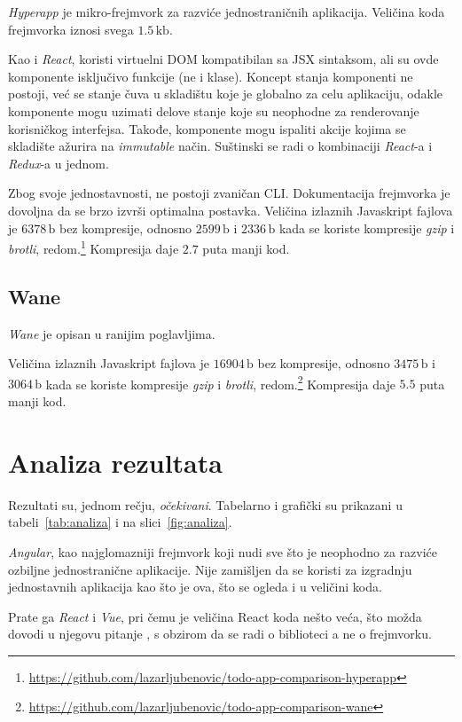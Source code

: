 \textsl{Hyperapp} je mikro-frejmvork za razviće jednostraničnih aplikacija.
Veličina koda frejmvorka iznosi svega $1.5\,\mathrm{kb}$.

Kao i \textsl{React}, koristi virtuelni DOM kompatibilan sa JSX sintaksom, ali su ovde komponente isključivo funkcije (ne i klase).
Koncept stanja komponenti ne postoji, već se stanje čuva u skladištu koje je globalno za celu aplikaciju, odakle komponente mogu uzimati delove stanje koje su neophodne za renderovanje korisničkog interfejsa.
Takođe, komponente mogu ispaliti akcije kojima se skladište ažurira na \textit{immutable} način.
Suštinski se radi o kombinaciji \textit{React}-a i \textit{Redux}-a u jednom.

Zbog svoje jednostavnosti, ne postoji zvaničan CLI.
Dokumentacija frejmvorka je dovoljna da se brzo izvrši optimalna postavka.
Veličina izlaznih Javaskript fajlova je $6378\,\mathrm{b}$ bez kompresije, odnosno $2599\,\mathrm{b}$ i $2336\,\mathrm{b}$ kada se koriste kompresije \textsl{gzip} i \textsl{brotli}, redom.\footnote{\url{https://github.com/lazarljubenovic/todo-app-comparison-hyperapp}} Kompresija daje $2.7$ puta manji kod.

\subsection{Wane}

\textsl{Wane} je opisan u ranijim poglavljima.

Veličina izlaznih Javaskript fajlova je $16904\,\mathrm{b}$ bez kompresije, odnosno $3475\,\mathrm{b}$ i $3064\,\mathrm{b}$ kada se koriste kompresije \textsl{gzip} i \textsl{brotli}, redom.\footnote{\url{https://github.com/lazarljubenovic/todo-app-comparison-wane}} Kompresija daje $5.5$ puta manji kod.

\section{Analiza rezultata}
\label{sec:analiza}

Rezultati su, jednom rečju, \emph{očekivani}.
Tabelarno i grafički su prikazani u tabeli~\ref{tab:analiza} i na slici~\ref{fig:analiza}.

\textsl{Angular}, kao najglomazniji frejmvork koji nudi sve što je neophodno za razviće ozbiljne jednostranične aplikacije.
Nije zamišljen da se koristi za izgradnju jednostavnih aplikacija kao što je ova, što se ogleda i u veličini koda.

Prate ga \textsl{React} i \textsl{Vue}, pri čemu je veličina React koda nešto veća, što možda dovodi u njegovu pitanje , s obzirom da se radi o biblioteci a ne o frejmvorku.

